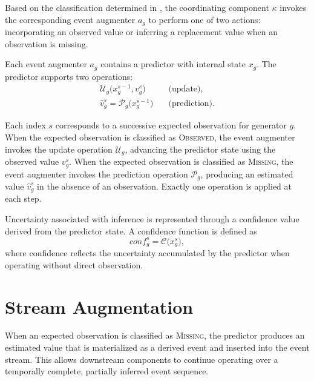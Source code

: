 Based on the classification determined in
, the coordinating component $\kappa$ invokes the
corresponding event augmenter $a_g$ to perform one of two actions: incorporating
an observed value or inferring a replacement value when an observation is
missing. 

Each event augmenter $a_g$ contains a predictor with internal
state $x_g$. The predictor supports two operations:
\begin{align}
\mathcal{U}_g\bigl(x_g^{s-1}, v_g^{s}\bigr)
&\quad\text{(update)}, \\
\hat{v}_g^{s} = \mathcal{P}_g\bigl(x_g^{s-1}\bigr)
&\quad\text{(prediction)}.
\end{align}

Each index $s$ corresponds to a successive expected observation for generator
$g$. When the expected observation is classified as \textsc{Observed}, the event
augmenter invokes the update operation $\mathcal{U}_g$, advancing the predictor
state using the observed value $v_g^{s}$. When the expected observation is
classified as \textsc{Missing}, the event augmenter invokes the prediction
operation $\mathcal{P}_g$, producing an estimated value $\hat{v}_g^{s}$ in the
absence of an observation. Exactly one operation is applied at each step.

Uncertainty associated with inference is represented through a confidence value
derived from the predictor state. A confidence function is defined as
\begin{equation}
conf_g^{s} = \mathcal{C}\bigl(x_g^{s}\bigr),
\end{equation}
\noindent
where confidence reflects the uncertainty accumulated by the predictor when
operating without direct observation.







\section{Stream Augmentation}
\label{sec:confidence-stream-augmentation}

When an expected observation is classified as \textsc{Missing}, the predictor produces an estimated value that is materialized as a derived event and inserted into the event stream. This allows downstream components to continue operating over a temporally complete, partially inferred event sequence.

